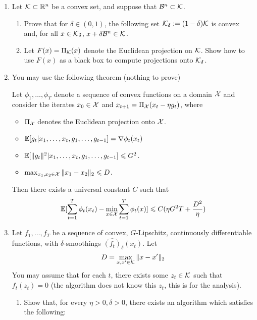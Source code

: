 \documentclass[12pt]{article}
\begin{document}
\begin{enumerate}
		\item Let ${\cal K} \subset \mathbb{R}^n$ be a convex set, and suppose that ${\cal B}^{n} \subset {\cal K}$. 
		\begin{enumerate}
			\item Prove that for $\delta \in (0,1)$, the following set ${\cal K}_{\delta} := (1-\delta){\cal K}$ is convex and, for all $x \in {\cal K}_{\delta}$, $x + \delta {\cal B}^{n} \in {\cal K}$. 
			\item Let $F(x) = \Pi_{{\cal K}}(x)$ denote the Euclidean projection on ${\cal K}$. Show how to use $F(x)$ as a black box to compute projections onto ${\cal K}_{\delta}$.
		\end{enumerate}
		\item You may use the following theorem (nothing to prove)
		\begin{theorem}\label{thm:online} Let $\phi_1,\dots,\phi_T$ denote a sequence of convex functions on a domain ${\cal X}$ and consider the iterates $x_0 \in {\cal X}$ and $x_{t+1} = \Pi_{{\cal X}} (x_t - \eta g_{t})$, where 
		\begin{itemize}
			\item $\Pi_{{\cal X}}$ denotes the Euclidean projection onto ${\cal X}$.
			\item $\mathbb{E}[ g_{t} | x_1,\dots,x_t,g_1,\dots,g_{t-1}] = \nabla \phi_t(x_t)$
			\item $\mathbb{E}[ \|g_{t}\|^2 | x_1,\dots,x_t,g_1,\dots,g_{t-1}] \leqslant G^2$. 
			\item $\max_{x_1,x_2 \in {\cal X}}\|x_1 - x_2\|_2 \leqslant D$. 
		\end{itemize}
		Then there exists a universal constant $C$ such that
		\begin{eqnarray}
			\mathbb{E}[\sum_{t=1}^T \phi_t(x_t) - \min_{x \in {\cal X}}\sum_{t=1}^T \phi_t(x)] \leqslant C(\eta G^2 T + \frac{D^2}{\eta})
		\end{eqnarray}
		\end{theorem}
		\item Let $f_{1},\dots,f_{T}$ be a sequence of convex, $G$-Lipschitz, continuously differentiable functions, with $\delta$-smoothings $\widehat{(f_t)}_{\delta}(x_t)$. Let
		\begin{eqnarray}
		D = \max_{x,x' \in {\cal K}} \|x - x'\|_2
		\end{eqnarray}
		You may assume that for each $t$, there exists some $z_t \in {\cal K}$ such that $f_t(z_t) = 0$ (the algorithm does not know this $z_t$, this is for the analysis).
		\begin{enumerate}
			\item Show that, for every $\eta > 0 , \delta > 0$, there exists an algorithm which satisfies the following:

\end{enumerate}
\end{enumerate}
\end{document}

